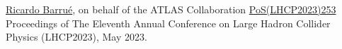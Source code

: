

\begin{cventries}
    {\underline{Ricardo Barrué}, on behalf of the ATLAS Collaboration}{}
    {\href{https://pos.sissa.it/450/253/}{PoS(LHCP2023)253}}
    {
        Proceedings of The Eleventh Annual Conference on Large Hadron Collider Physics (LHCP2023), May 2023.
    }
\end{cventries}